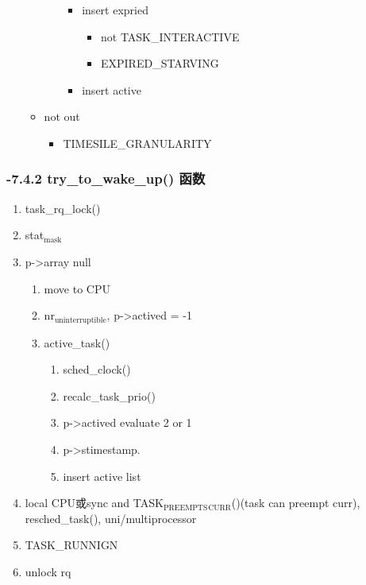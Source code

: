 \documentclass[11pt]{article}
\begin{document}
\begin{itemize}
\begin{itemize}
\begin{itemize}
\begin{itemize}
\item insert expried

\begin{itemize}
\item not TASK\_INTERACTIVE
\item EXPIRED\_STARVING
\end{itemize}

\item insert active
\end{itemize}

\end{itemize}

\item not out

\begin{itemize}
\item TIMESILE\_GRANULARITY
\end{itemize}

\end{itemize}
\end{itemize} %
\subsubsection{-7.4.2 try\_to\_wake\_up() 函数}
\label{sec-2.4.2}

    
\begin{enumerate}
\item task\_rq\_lock()
\item stat$_{\mathrm{mask}}$
\item p->array null

\begin{enumerate}
\item move to CPU
\item nr$_{\mathrm{uninterruptible}}$, p->actived = -1
\item active\_task()

\begin{enumerate}
\item sched\_clock()
\item recalc\_task\_prio()
\item p->actived evaluate 2 or 1
\item p->stimestamp.
\item insert active list
\end{enumerate}

\end{enumerate}

\item local CPU或sync and TASK$_{\mathrm{PREEMPTS}}$$_{\mathrm{CURR}}$()(task can preempt curr),
   resched\_task(), uni/multiprocessor
\item TASK\_RUNNIGN
\item unlock rq
\end{enumerate}
\end{document}
